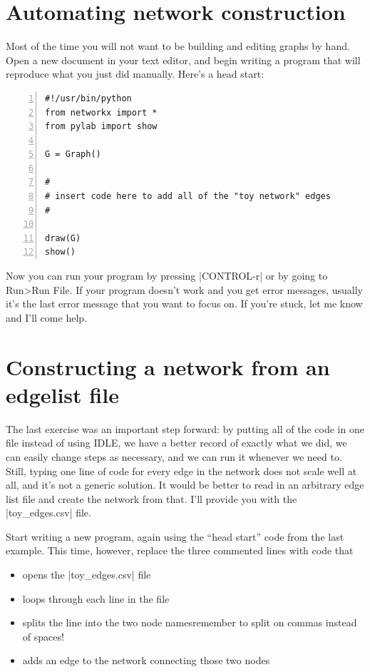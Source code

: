 \documentclass{article}
\begin{document}
\section{Automating network construction}
Most of the time you will not want to be building and editing graphs by hand.  Open a new document in your text editor, and begin writing a program that will reproduce what you just did manually.  Here's a head start:

\begin{Verbatim}[numbers = left, samepage=true]
#!/usr/bin/python
from networkx import *
from pylab import show

G = Graph()

#
# insert code here to add all of the "toy network" edges
#

draw(G)
show()
\end{Verbatim}

Now you can run your program by pressing |CONTROL-r| or by going to Run\textgreater Run File.  If your program doesn't work and you get error
 messages, usually it's the last error message that you want to focus on.  If you're stuck, let me know and I'll come help.

\section{Constructing a network from an edgelist file}
\label{edges_to_net}
The last exercise was an important step forward: by putting all of the code in one file instead of using IDLE, we have a better record of exactly what
we did, we can easily change steps as necessary, and we can run it whenever we need to.  Still, typing one line of code for every edge in the network
does not scale well at all, and it's not a generic solution.  It would be better to read in an arbitrary edge list file and create the network from that.
I'll provide you with the |toy_edges.csv| file.

Start writing a new program, again using the ``head start'' code from the last example.  This time, however, replace the three commented lines with 
code that

\begin{itemize}
\item opens the |toy_edges.csv| file
\item loops through each line in the file
\item splits the line into the two node names\textemdash remember to split on commas instead of spaces!
\item adds an edge to the network connecting those two nodes
\end{itemize}
\end{document}
